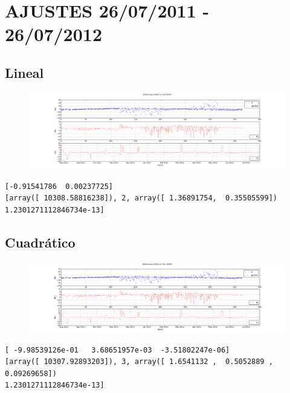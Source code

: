 \section*{AJUSTES 26/07/2011 - 26/07/2012}
\subsection*{Lineal}
\begin{figure}[!h]
\centering
  \includegraphics[width=\textwidth]{imagenes/sacDajusteG1}
\end{figure}
\begin{verbatim}
[-0.91541786  0.00237725]
[array([ 10308.58816238]), 2, array([ 1.36891754,  0.35505599])
1.2301271112846734e-13]
\end{verbatim}

\subsection*{Cuadr\'atico}
\begin{figure}[!h]
\centering
  \includegraphics[width=\textwidth]{imagenes/sacDajusteG2}
\end{figure}
\begin{verbatim}
[ -9.98539126e-01   3.68651957e-03  -3.51802247e-06]
[array([ 10307.92893203]), 3, array([ 1.6541132 ,  0.5052889 ,  0.09269658])
1.2301271112846734e-13]
\end{verbatim}

